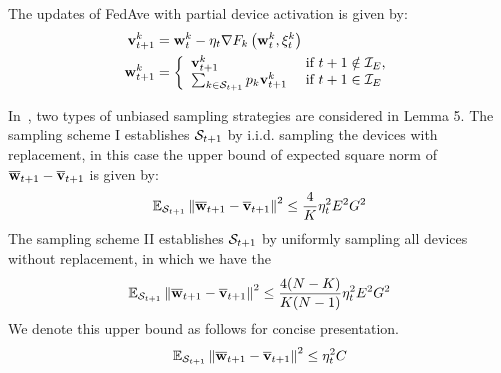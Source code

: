 The updates of FedAve with partial device activation is given by: 
\begin{align} 
\mathbf{v}_{t+1}^{k} &=\mathbf{w}_{t}^{k}-\eta_{t} \nabla F_{k}\left(\mathbf{w}_{t}^{k}, \xi_{t}^{k}\right) \\ \mathbf{w}_{t+1}^{k} &=\left\{\begin{array}{ll}\mathbf{v}_{t+1}^{k} & \text { if } t+1 \notin \mathcal{I}_{E}, \\ 
\sum_{k \in {\mathcal{S}}_{t+1}} p_{k} \mathbf{v}_{t+1}^{k} & \text { if } t+1 \in \mathcal{I}_{E}\end{array}\right.
\end{align}

In~\cite{li2019convergence}, two types of unbiased sampling strategies are considered in Lemma 5. 
The sampling scheme I establishes ${\mathcal{S}}_{t+1}$ by i.i.d. sampling the devices with replacement,
in this case the upper bound of expected square norm of ${\overline{\mathbf{w}}}_{t+1} - {\overline{\mathbf{v}}}_{t+1}$ is given by:
\begin{align}
\mathbb{E}_{{\mathcal{S}}_{t+1}}\left\|{\overline{\mathbf{w}}}_{t+1} - {\overline{\mathbf{v}}}_{t+1}\right\|^2	\leq \frac{4}{K} \eta_t^2 E^2G^2
\end{align}
The sampling scheme II establishes ${\mathcal{S}}_{t+1}$ by uniformly sampling all devices without
replacement, in which we have the 
\begin{align}
\mathbb{E}_{{\mathcal{S}}_{t+1}}\left\|{\overline{\mathbf{w}}}_{t+1} - {\overline{\mathbf{v}}}_{t+1}\right\|^2	\leq \frac{4(N - K)}{K(N-1)} \eta_t^2 E^2G^2
\end{align}
We denote this upper bound as follows for concise presentation. 
\begin{align}
	\mathbb{E}_{{\mathcal{S}}_{t+1}}\left\|{\overline{\mathbf{w}}}_{t+1} - {\overline{\mathbf{v}}}_{t+1}\right\|^2 \leq  \eta_t^2 C
	\label{eq:partialsample}
\end{align}




